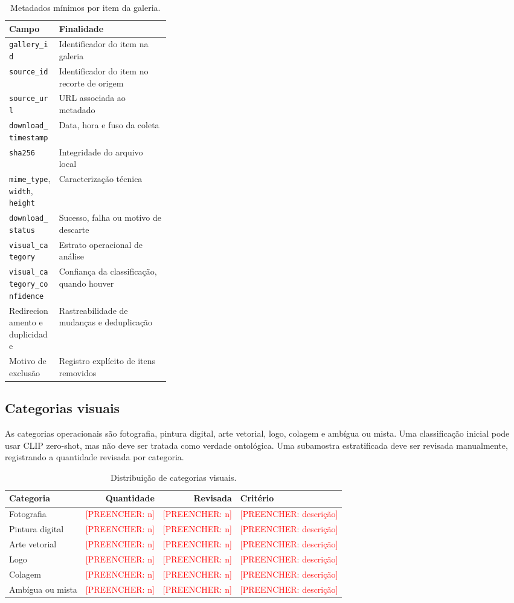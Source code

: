 \documentclass[12pt]{article}
\newcommand{\todo}[1]{\textcolor{red}{[PREENCHER: #1]}}
\newcommand{\clip}{CLIP}
\begin{document}
\begin{table}[H]
\centering
\caption{Metadados mínimos por item da galeria.}
\label{tab:metadados}
\begin{tabularx}{\linewidth}{p{0.31\linewidth}Y}
\toprule
\textbf{Campo} & \textbf{Finalidade}\\
\midrule
\texttt{gallery\_id} & Identificador do item na galeria\\
\texttt{source\_id} & Identificador do item no recorte de origem\\
\texttt{source\_url} & URL associada ao metadado\\
\texttt{download\_timestamp} & Data, hora e fuso da coleta\\
\texttt{sha256} & Integridade do arquivo local\\
\texttt{mime\_type}, \texttt{width}, \texttt{height} & Caracterização técnica\\
\texttt{download\_status} & Sucesso, falha ou motivo de descarte\\
\texttt{visual\_category} & Estrato operacional de análise\\
\texttt{visual\_category\_confidence} & Confiança da classificação, quando houver\\
Redirecionamento e duplicidade & Rastreabilidade de mudanças e deduplicação\\
Motivo de exclusão & Registro explícito de itens removidos\\
\bottomrule
\end{tabularx}
\end{table}

\subsection{Categorias visuais}

As categorias operacionais são fotografia, pintura digital, arte vetorial,
logo, colagem e ambígua ou mista. Uma classificação inicial pode usar
\clip{} zero-shot, mas não deve ser tratada como verdade ontológica. Uma
subamostra estratificada deve ser revisada manualmente, registrando a
quantidade revisada por categoria.

\begin{table}[H]
\centering
\caption{Distribuição de categorias visuais.}
\label{tab:categorias}
\begin{tabularx}{\linewidth}{Y r r Y}
\toprule
\textbf{Categoria} & \textbf{Quantidade} & \textbf{Revisada} & \textbf{Critério}\\
\midrule
Fotografia & \todo{n} & \todo{n} & \todo{descrição}\\
Pintura digital & \todo{n} & \todo{n} & \todo{descrição}\\
Arte vetorial & \todo{n} & \todo{n} & \todo{descrição}\\
Logo & \todo{n} & \todo{n} & \todo{descrição}\\
Colagem & \todo{n} & \todo{n} & \todo{descrição}\\
Ambígua ou mista & \todo{n} & \todo{n} & \todo{descrição}\\
\bottomrule
\end{tabularx}
\end{table}
\end{document}
